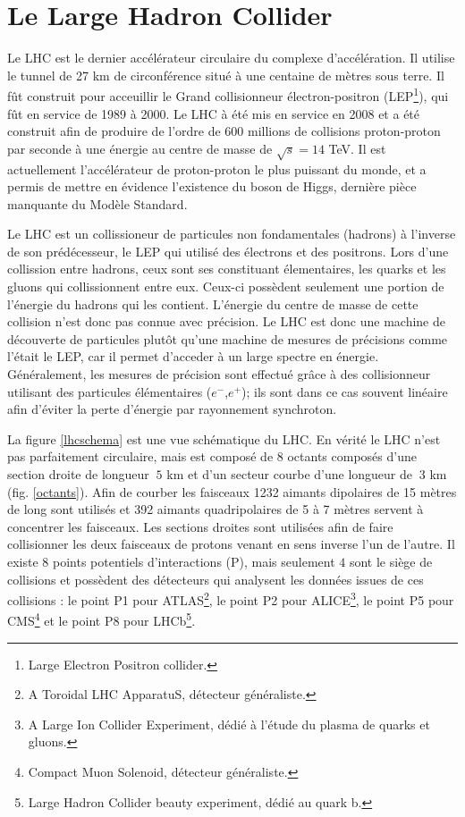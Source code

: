 \section{Le Large Hadron Collider}
Le LHC est le dernier accélérateur circulaire du complexe d'accélération. Il utilise le tunnel de 27 km de circonférence situé à une centaine de mètres sous terre. Il fût construit pour acceuillir le Grand collisionneur électron-positron (LEP\footnote{Large Electron Positron collider.}), qui fût en service de 1989 à 2000. Le LHC à été mis en service en 2008 et a été construit afin de produire de l'ordre de 600 millions de collisions proton-proton par seconde à une énergie au centre de masse de $\sqrt{s}=14$ TeV. Il est actuellement l'accélérateur de proton-proton le plus puissant du monde, et a permis de mettre en évidence l'existence du boson de Higgs, dernière pièce manquante du Modèle Standard.

Le LHC est un collissioneur de particules non fondamentales (hadrons) à l'inverse de son prédécesseur, le LEP qui utilisé des électrons et des positrons. Lors d'une collission entre hadrons, ceux sont ses constituant élementaires, les quarks et les gluons qui collissionnent entre eux. Ceux-ci possèdent seulement une portion de l'énergie du hadrons qui les contient. L'énergie du centre de masse de cette collision n'est donc pas connue avec précision. Le LHC est donc une machine de découverte de particules plutôt qu'une machine de mesures de précisions comme l'était le LEP, car il permet d'acceder à un large spectre en énergie. Généralement, les mesures de précision sont effectué grâce à des collisionneur utilisant des particules élémentaires ($e^{-}$,$e^{+}$); ils sont dans ce cas souvent linéaire afin d'éviter la perte d'énergie par rayonnement synchroton.

La figure \ref{lhcschema} est une vue schématique du LHC. En vérité le LHC n'est pas parfaitement circulaire, mais est composé de $8$ octants composés d'une section droite de longueur $~5$ km et d'un secteur courbe d'une longueur de $~3$ km (fig. \ref{octants}). Afin de courber les faisceaux 1232 aimants dipolaires de 15 mètres de long sont utilisés et 392 aimants quadripolaires de 5 à 7 mètres servent à concentrer les faisceaux. Les sections droites sont utilisées afin de faire collisionner les deux faisceaux de protons venant en sens inverse l'un de l'autre. Il existe $8$ points potentiels d'interactions (P), mais seulement $4$ sont le siège de collisions et possèdent des détecteurs qui analysent les données issues de ces collisions : le point P1 pour ATLAS\footnote{A Toroidal LHC ApparatuS, détecteur généraliste.}, le point P2 pour ALICE\footnote{A Large Ion Collider Experiment, dédié à l'étude du plasma de quarks et gluons.}, le point P5 pour CMS\footnote{Compact Muon Solenoid, détecteur généraliste.} et le point P8 pour LHCb\footnote{Large Hadron Collider beauty experiment, dédié au quark b.}.

